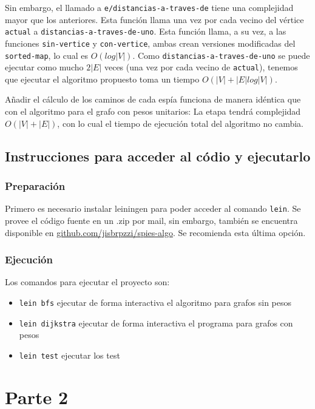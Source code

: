 \documentclass{article}
\begin{document}
Sin embargo, el llamado a \texttt{e/distancias-a-traves-de} tiene una complejidad mayor que los anteriores. Esta función llama una vez por cada vecino del vértice \texttt{actual} a \texttt{distancias-a-traves-de-uno}. Esta función llama, a su vez, a las funciones \texttt{sin-vertice} y \texttt{con-vertice}, ambas crean versiones modificadas del \texttt{sorted-map}, lo cual es $O(log |V|)$. Como \texttt{distancias-a-traves-de-uno} se puede ejecutar como mucho $2|E|$ veces (una vez por cada vecino de \texttt{actual}), tenemos que ejecutar el algoritmo propuesto toma un tiempo $O(|V| + |E| log|V|)$.

Añadir el cálculo de los caminos de cada espía funciona de manera idéntica que con el algoritmo para el grafo con pesos unitarios: La etapa tendrá complejidad $O(|V| + |E|)$, con lo cual el tiempo de ejecución total del algoritmo no cambia.

\subsection{Instrucciones para acceder al códio y ejecutarlo}

\subsubsection{Preparación}
Primero es necesario instalar leiningen para poder acceder al comando \texttt{lein}. Se provee el código fuente en un .zip por mail, sin embargo, también se encuentra disponible en \href{http://github.com/jisbruzzi/spies-algo}{github.com/jisbrpzzi/spies-algo}. Se recomienda esta última opción.

\subsubsection{Ejecución}
Los comandos para ejecutar el proyecto son:

\begin{itemize}

\item \texttt{lein bfs} ejecutar de forma interactiva el algoritmo para grafos sin pesos
\item \texttt{lein dijkstra} ejecutar de forma interactiva el programa para grafos con pesos
\item \texttt{lein test} ejecutar los test

\end{itemize}

\newpage
\section{Parte 2}
\end{document}
